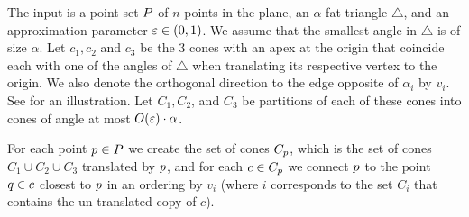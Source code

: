 \documentclass[12pt]{article}%
\begin{document}
The input is a point set $P$ of $n$ points in the plane, an
$\alpha$-fat triangle $\triangle$, and an approximation parameter
$\varepsilon \in (0,1)$. We assume that the smallest angle in $\triangle$ is
of size $\alpha$. Let $c_1,c_2$ and $c_3$ be the 3 cones with an apex
at the origin that coincide each with one of the angles of $\triangle$
when translating its respective vertex to the origin. We also denote
the orthogonal direction to the edge opposite of $\alpha_i$ by
$v_i$. See  for an illustration. Let $C_1,C_2$, and
$C_3$ be partitions of each of these cones into cones of angle at most
$O(\varepsilon)\cdot \alpha$.

For each point $p\in P$ we create the set of cones $C_p$, which
is the set of cones $C_1\cup C_2\cup C_3$ translated by $p$, and for
each $c\in C_p$ we connect $p$ to the point $q\in c$ closest to
$p$ in an ordering by $v_i$ (where $i$ corresponds to the set $C_i$
that contains the un-translated copy of $c$).

%
%
\end{document}
